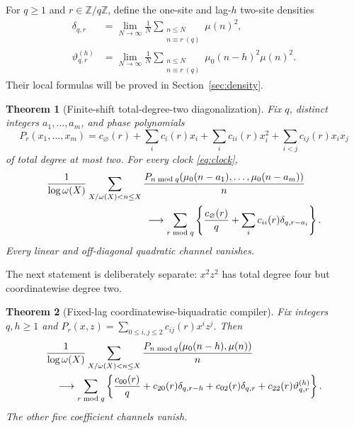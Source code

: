 \documentclass[11pt]{article}
\newtheorem{theorem}{Theorem}[section]
\theoremstyle{definition}
\theoremstyle{remark}
\newcommand{\mob}{\mu}
\newcommand{\dd}{\delta}
\newcommand{\thh}{\vartheta}
\newcommand{\Zq}{\mathbb Z/q\mathbb Z}
\begin{document}
For \(q\ge1\) and \(r\in\Zq\), define the one-site and lag-\(h\) two-site
densities
\begin{align}
 \dd_{q,r}&=\lim_{N\to\infty}\frac1N
  \sum_{\substack{n\le N\\n\equiv r\ (q)}}\mob(n)^2,
 \label{eq:delta-def}\\
 \thh^{(h)}_{q,r}&=\lim_{N\to\infty}\frac1N
  \sum_{\substack{n\le N\\n\equiv r\ (q)}}
  \mob_0(n-h)^2\mob(n)^2.
 \label{eq:theta-def}
\end{align}
Their local formulas will be proved in Section~\ref{sec:density}.

\begin{theorem}[Finite-shift total-degree-two diagonalization]
\label{thm:finite-shift}
Fix \(q\), distinct integers \(a_1,\ldots,a_m\), and phase polynomials
\[
 P_r(x_1,\ldots,x_m)=c_\varnothing(r)+
 \sum_i c_i(r)x_i+\sum_i c_{ii}(r)x_i^2+
 \sum_{i<j}c_{ij}(r)x_ix_j
\]
of total degree at most two.  For every clock \eqref{eq:clock},
\begin{align}
 &\frac1{\log\omega(X)}\sum_{X/\omega(X)<n\le X}
 \frac{P_{n\bmod q}(\mob_0(n-a_1),\ldots,\mob_0(n-a_m))}{n}
 \notag\\
 &\hspace{35mm}\longrightarrow
 \sum_{r\bmod q}\left\{\frac{c_\varnothing(r)}q+
 \sum_i c_{ii}(r)\dd_{q,r-a_i}\right\}.
 \label{eq:finite-shift}
\end{align}
Every linear and off-diagonal quadratic channel vanishes.
\end{theorem}

The next statement is deliberately separate: \(x^2z^2\) has total degree
four but coordinatewise degree two.

\begin{theorem}[Fixed-lag coordinatewise-biquadratic compiler]
\label{thm:biquadratic}
Fix integers \(q,h\ge1\) and
\(P_r(x,z)=\sum_{0\le i,j\le2}c_{ij}(r)x^iz^j\).  Then
\begin{align}
 &\frac1{\log\omega(X)}\sum_{X/\omega(X)<n\le X}
 \frac{P_{n\bmod q}(\mob_0(n-h),\mob(n))}{n}
 \notag\\
 &\quad\longrightarrow\sum_{r\bmod q}\left\{
 \frac{c_{00}(r)}q+c_{20}(r)\dd_{q,r-h}
 +c_{02}(r)\dd_{q,r}+c_{22}(r)\thh^{(h)}_{q,r}\right\}.
 \label{eq:biquadratic}
\end{align}
The other five coefficient channels vanish.
\end{theorem}
\end{document}
